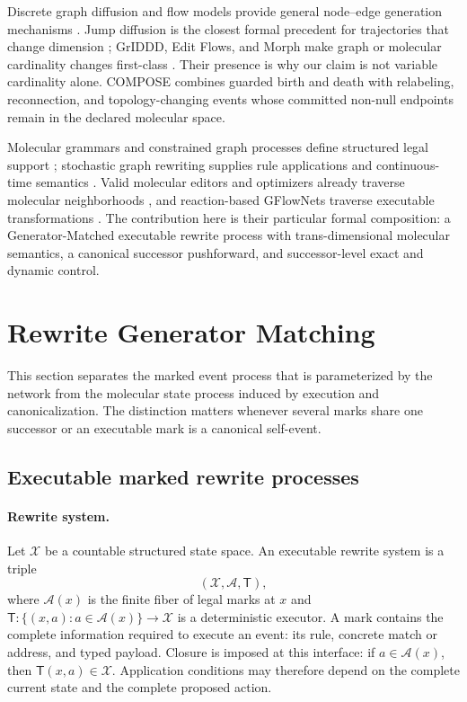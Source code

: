 \documentclass[10pt,letterpaper]{article}
\newcommand{\X}{\mathcal{X}}
\newcommand{\A}{\mathcal{A}}
\newcommand{\T}{\mathsf{T}}
\begin{document}
Discrete graph diffusion and flow models provide general node--edge
generation mechanisms
\citep{austin2021d3pm,campbell2022ctdd,vignac2023digress,qin2025defog,
jo2022gdss,jo2023grum}. Jump diffusion is the closest formal precedent for
trajectories that change dimension \citep{campbell2023jump}; GrIDDD, Edit
Flows, and Morph make graph or molecular cardinality changes first-class
\citep{ninniri2025griddd,havasi2025editflows,franke2026morph}. Their presence
is why our claim is not variable cardinality alone. COMPOSE combines guarded
birth and death with relabeling, reconnection, and topology-changing events
whose committed non-null endpoints remain in the declared molecular space.

Molecular grammars and constrained graph processes define structured legal
support \citep{kajino2019mhg,guo2022grammar,madeira2024construct,
ruizbotella2026cocograph}; stochastic graph rewriting supplies rule
applications and continuous-time semantics
\citep{danos2015thermodynamic,behr2021rewriting}. Valid molecular editors and
optimizers already traverse molecular neighborhoods
\citep{xie2021mars,fu2021mimosa,jensen2019graphga,gao2022pmo}, and
reaction-based GFlowNets traverse executable transformations
\citep{koziarski2024rgfn,zhu2026spacegfn}. The contribution here is their
particular formal composition: a Generator-Matched executable rewrite process
with trans-dimensional molecular semantics, a canonical successor
pushforward, and successor-level exact and dynamic control.

\section{Rewrite Generator Matching}
\label{sec:rgm}

This section separates the marked event process that is parameterized by the
network from the molecular state process induced by execution and
canonicalization. The distinction matters whenever several marks share one
successor or an executable mark is a canonical self-event.

\subsection{Executable marked rewrite processes}
\label{sec:marked-process}

\paragraph{Rewrite system.}
Let $\X$ be a countable structured state space. An executable rewrite system is
a triple
\[
  (\X,\A,\T),
\]
where $\A(x)$ is the finite fiber of legal marks at $x$ and
$\T:\{(x,a):a\in\A(x)\}\rightarrow\X$ is a deterministic executor. A mark
contains the complete information required to execute an event: its rule,
concrete match or address, and typed payload. Closure is imposed at this
interface: if $a\in\A(x)$, then $\T(x,a)\in\X$. Application conditions may
therefore depend on the complete current state and the complete proposed
action.
\end{document}
